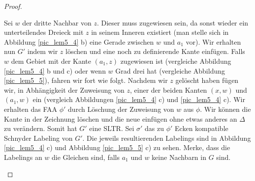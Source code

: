 \begin{proof}
\begin{description}[leftmargin =0pt, font = \bfseries]
Sei $w$ der dritte Nachbar von $z$. Dieser muss zugewiesen sein, da sonst wieder ein unterteilendes Dreieck mit $z$ in seinem Inneren existiert (man stelle sich in Abbildung \ref{pic_lem5_4} b) eine Gerade zwischen $w$ und $a_1$ vor). Wir erhalten nun $G'$ indem wir $z$ löschen und eine noch zu definierende Kante einfügen. Falls $w$ dem Gebiet mit der Kante $(a_1,z)$ zugewiesen ist (vergleiche Abbildung \ref{pic_lem5_4} b und c) oder wenn $w$ Grad drei hat (vergleiche Abbildung \ref{pic_lem5_5}), fahren wir fort wie folgt. Nachdem wir $z$ gelöscht haben fügen wir, in Abhängigkeit der Zuweisung von $z$, einer der beiden Kanten $(x,w)$ und $(a_1,w)$ ein (vergleich Abbildungen \ref{pic_lem5_4} c) und \ref{pic_lem5_4} c). Wir erhalten das FAA $\phi'$ durch Löschung der Zuweisung von $w$ aus $\phi$. Wir können die Kante in der Zeichnung löschen und die neue einfügen ohne etwas anderes an $\Delta$ zu verändern. Somit hat $G'$ eine SLTR. Sei $\sigma'$ das zu $\phi'$ Ecken kompatible Schnyder Labeling von $G'$. Die jeweils resultierenden Labelings sind in Abbildung \ref{pic_lem5_4} c) und Abbildung \ref{pic_lem5_5} c) zu sehen. Merke, dass die Labelings an $w$ die Gleichen sind, falls $a_1$ und $w$ keine Nachbarn in $G$ sind. 


\end{description}
\end{proof}
